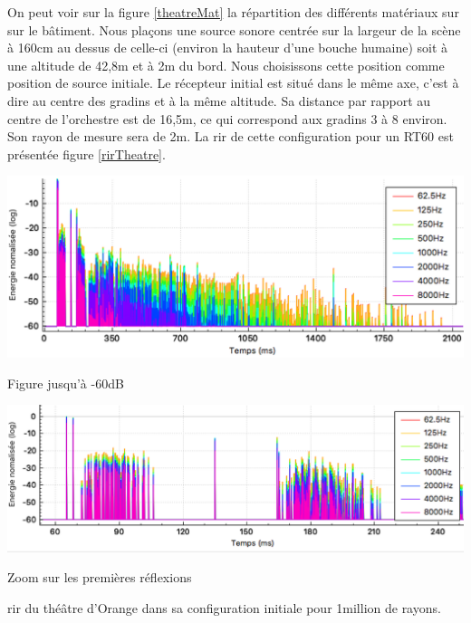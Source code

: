 On peut voir sur la figure \ref{theatreMat} la répartition des différents matériaux sur sur le bâtiment. Nous plaçons une source sonore centrée sur la largeur de la scène à 160cm au dessus de celle-ci (environ la hauteur d'une bouche humaine) soit à une altitude de 42,8m et à 2m du bord. Nous choisissons cette position comme position de source initiale. Le récepteur initial est situé dans le même axe, c'est à dire au centre des gradins et à la même altitude. Sa distance par rapport au centre de l'orchestre est de 16,5m, ce qui correspond aux gradins 3 à 8 environ. Son rayon de mesure sera de 2m. La \gls{rir} de cette configuration pour un \gls{RT60} est présentée figure \ref{rirTheatre}.

\begin{figureth}
	\begin{subfigureth}{\linewidth}
		\includegraphics[width=\linewidth]{images/rirTheatre}
			\caption{Figure jusqu'à -60dB}
		\label{rirTheatre60}
	\end{subfigureth}
	\begin{subfigureth}{\linewidth}
		\includegraphics[width=\linewidth]{images/rirTheatrezoom}
		\caption{Zoom sur les premières réflexions}
		\label{rirTheatre30}
	\end{subfigureth}
	\caption{\gls{rir} du théâtre d'Orange dans sa configuration initiale pour 1million de rayons.}
	\label{rirTheatre}
\end{figureth}

